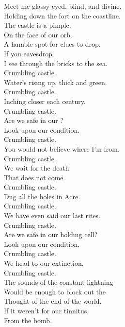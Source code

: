 
\label{album:polygondwanaland}




Meet me glassy eyed, blind, and divine. \\
Holding down the fort on the coastline. \\
The castle is a pimple. \\
On the face of our orb. \\
A humble spot for clues to drop. \\
If you eavesdrop. \\

I see through the bricks to the sea. \\
Crumbling castle. \\
Water's rising up, thick and green. \\
Crumbling castle. \\
Inching closer each century. \\
Crumbling castle. \\
Are we safe in our ? \\
Look upon our condition. \\
Crumbling castle. \\
You would not believe where I'm from. \\
Crumbling castle. \\

We wait for the death \\
That does not come. \\
Crumbling castle. \\
Dug all the holes in  Acre. \\
Crumbling castle. \\
We have even said our last rites. \\
Crumbling castle. \\
Are we safe in our holding cell? \\
Look upon our condition. \\
Crumbling castle. \\
We head to our extinction. \\
Crumbling castle. \\

The sounds of the constant lightning \\
Would be enough to block out the \\
Thought of the end of the world. \\
If it weren't for our tinnitus. \\
From the bomb. \\


